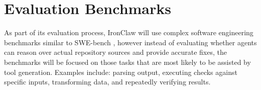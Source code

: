 \section{Evaluation Benchmarks}
As part of its evaluation process, IronClaw will use complex software engineering
benchmarks similar to SWE-bench \cite{swebench}, however instead of evaluating
whether agents can reason over actual repository sources and provide accurate
fixes, the benchmarks will be focused on those tasks that are most likely to
be assisted by tool generation. Examples include: parsing output, executing
checks against specific inputs, transforming data, and repeatedly verifying
results.
